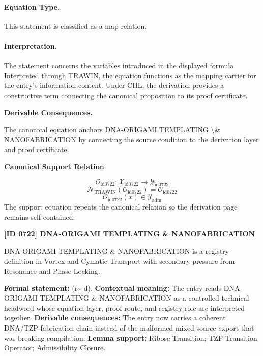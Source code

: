 \paragraph{Equation Type.}
This statement is classified as a map relation.

\paragraph{Interpretation.}
The statement concerns the variables introduced in the displayed formula. Interpreted through TRAWIN, the equation functions as the mapping carrier for the entry’s information content. Under CHL, the derivation provides a constructive term connecting the canonical proposition to its proof certificate.

\par\vspace{0.35em}
\noindent\textbf{Derivable Consequences.}\quad
\begingroup
\footnotesize
\raggedright
The canonical equation anchors DNA-ORIGAMI TEMPLATING \textbackslash{}\& NANOFABRICATION by connecting the source condition to the derivation layer and proof certificate.
\par\endgroup

\noindent\textbf{Canonical Support Relation}\par
\[
\mathcal{O}_{\mathrm{id0722}}:\mathcal{X}_{\mathrm{id0722}}\longrightarrow\mathcal{Y}_{\mathrm{id0722}}
\]
\[
\mathcal{N}_{\mathrm{TRAWIN}}(\mathcal{O}_{\mathrm{id0722}})=\mathcal{O}_{\mathrm{id0722}}
\]
\[
\mathcal{O}_{\mathrm{id0722}}(x)\in\mathcal{Y}_{\mathrm{adm}}
\]
\noindent The support equation repeats the canonical relation so the derivation page remains self-contained.\par

\clearpage
\noindent\textbf{[ID 0722] DNA-ORIGAMI TEMPLATING \& NANOFABRICATION}\par
\vspace{0.35em}
\begingroup\small
{}
DNA-ORIGAMI TEMPLATING \& NANOFABRICATION is a registry definition in Vortex and Cymatic Transport with secondary pressure from Resonance and Phase Locking.

\begingroup\footnotesize\setlength{\emergencystretch}{3em}\sloppy
\textbf{Formal statement:} (r\textasciitilde{} d). \textbf{Contextual meaning:} The entry reads DNA-ORIGAMI TEMPLATING \& NANOFABRICATION as a controlled technical headword whose equation layer, proof route, and registry role are interpreted together. \textbf{Derivable consequences:} The entry now carries a coherent DNA/TZP fabrication chain instead of the malformed mixed-source export that was breaking compilation. \textbf{Lemma support:} Ribose Transition; TZP Transition Operator; Admissibility Closure.\par
\endgroup

